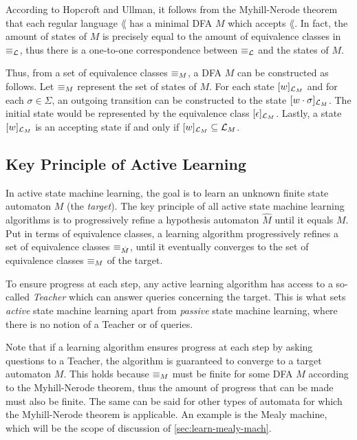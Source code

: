 According to Hopcroft and Ullman, it follows from the Myhill-Nerode theorem that
each regular language $\lang$ has a minimal DFA $M$ which accepts
$\lang$\cite{Hopcroft2001}. In fact, the amount of states of $M$ is precisely
equal to the amount of equivalence classes in $\equiv_{\mathcal{L}}$, thus there is a
one-to-one correspondence between $\equiv_{\mathcal{L}}$ and the states of $M$.

Thus, from a set of equivalence classes $\equiv_M$, a DFA $M$ can be constructed
as follows. Let $\equiv_M$ represent the set of states of $M$. For each state
$[w]_{\mathcal{L}_M}$ and for each $\sigma \in \Sigma$, an outgoing transition
can be constructed to the state $[w\cdot\sigma]_{\mathcal{L}_M}$. The initial
state would be represented by the equivalence class
$[\epsilon]_{\mathcal{L}_M}$. Lastly, a state $[w]_{\mathcal{L}_M}$ is an
accepting state if and only if $[w]_{\mathcal{L}_M} \subseteq \mathcal{L}_M$.

\subsection{Key Principle of Active Learning}
\label{sec:key-principle-active}
In active state machine learning, the goal is to learn an unknown finite state
automaton $M$ (the \textit{target}). The key principle of all active state
machine learning algorithms is to progressively refine a hypothesis automaton
$\hat M$ until it equals $M$. Put in terms of equivalence classes, a learning
algorithm progressively refines a set of equivalence classes $\equiv_{\hat M}$,
until it eventually converges to the set of equivalence classes $\equiv_M$ of the
target.

To ensure progress at each step, any active learning algorithm has access to a
so-called \textit{Teacher} which can answer queries concerning the target. This
is what sets \textit{active} state machine learning apart from \textit{passive}
state machine learning, where there is no notion of a Teacher or of queries.

Note that if a learning algorithm ensures progress at each step by asking
questions to a Teacher, the algorithm is guaranteed to converge to a target
automaton $M$. This holds because $\equiv_M$ must be finite for some DFA $M$
according to the Myhill-Nerode theorem, thus the amount of progress that can be
made must also be finite. The same can be said for other types of automata for
which the Myhill-Nerode theorem is applicable. An example is the Mealy machine,
which will be the scope of discussion of \cref{sec:learn-mealy-mach}.

